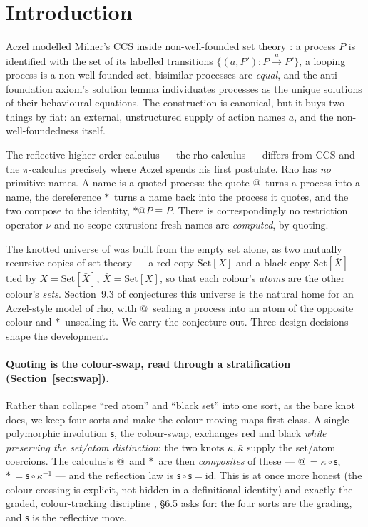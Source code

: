 \documentclass[11pt]{article}
\makeatletter
\newcommand{\swp}{\mathsf{s}}                  %
\newcommand{\kt}{\kappa}                       %
\newcommand{\ktb}{\bar\kappa}                  %
\newcommand{\drp}[1]{{\ast}#1}
\newcommand{\quo}[1]{@#1}
\newcommand{\Set}{\mathrm{Set}}
\newcommand{\lts}[1]{\xrightarrow{\,#1\,}}
\newcommand{\scong}{\equiv}
\theoremstyle{plain}
\theoremstyle{definition}
\makeatother
\begin{document}
\section{Introduction}

Aczel modelled Milner's CCS inside non-well-founded set theory \cite{aczel}: a
process $P$ is identified with the set of its labelled transitions
$\{(a,P'):P\lts a P'\}$, a looping process is a non-well-founded set, bisimilar
processes are \emph{equal}, and the anti-foundation axiom's solution lemma
individuates processes as the unique solutions of their behavioural equations.
The construction is canonical, but it buys two things by fiat: an external,
unstructured supply of action names $a$, and the non-well-foundedness itself.

The reflective higher-order calculus --- the rho calculus \cite{rho} --- differs
from CCS and the $\pi$-calculus precisely where Aczel spends his first postulate.
Rho has \emph{no} primitive names. A name is a quoted process: the quote
$\quo{\,}$ turns a process into a name, the dereference $\drp{\,}$ turns a name
back into the process it quotes, and the two compose to the identity,
$\drp{\quo P}\scong P$. There is correspondingly no restriction operator $\nu$ and
no scope extrusion: fresh names are \emph{computed}, by quoting.

The knotted universe of \cite{knot} was built from the empty set alone, as two
mutually recursive copies of set theory --- a red copy $\Set[X]$ and a black copy
$\Set[\bar X]$ --- tied by $X=\Set[\bar X]$, $\bar X=\Set[X]$, so that each
colour's \emph{atoms} are the other colour's \emph{sets}. Section~9.3 of
\cite{knot} conjectures this universe is the natural home for an Aczel-style model
of rho, with $\quo{\,}$ sealing a process into an atom of the opposite colour and
$\drp{\,}$ unsealing it. We carry the conjecture out. Three design decisions shape
the development.

\paragraph{Quoting is the colour-swap, read through a stratification (Section~\ref{sec:swap}).}
Rather than collapse ``red atom'' and ``black set'' into one sort, as the bare
knot does, we keep four sorts and make the colour-moving maps first class. A
single polymorphic involution $\swp$, the colour-swap, exchanges red and black
\emph{while preserving the set/atom distinction}; the two knots $\kt,\ktb$ supply
the set/atom coercions. The calculus's $\quo{\,}$ and $\drp{\,}$ are then
\emph{composites} of these --- $\quo{\,}=\kt\circ\swp$, $\drp{\,}=\swp\circ\kt^{-1}$
--- and the reflection law is $\swp\circ\swp=\mathrm{id}$. This is at once more
honest (the colour crossing is explicit, not hidden in a definitional identity)
and exactly the graded, colour-tracking discipline \cite{knot}, \S6.5 asks for:
the four sorts are the grading, and $\swp$ is the reflective move.
\end{document}
